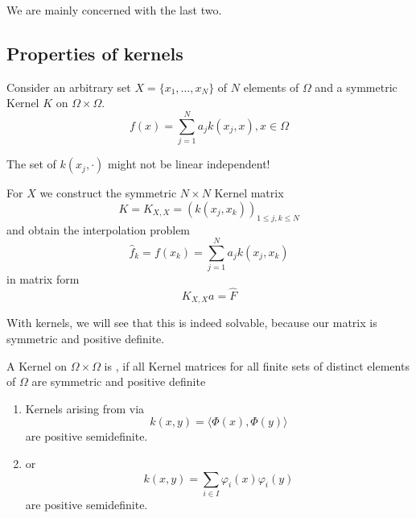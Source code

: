 We are mainly concerned with the last two.


\subsection{Properties of kernels}
Consider an arbitrary set $X=\{x_1,\dots,x_N\}$ 
of $N$  elements of $\Omega$ 
and a symmetric Kernel $K$ on $\Omega\times \Omega$.
\[f(x)=\sum_{j=1}^N a_j k(x_j,x),x\in\Omega\]
\begin{remark}
    The set of $k(x_j,\cdot)$ might not be linear independent!
\end{remark}

For $X$ we construct the symmetric $N\times N$ Kernel matrix
\[K=K_{X,X}=(k(x_j,x_k))_{{1\leq j,k\leq N}}\]
and obtain the interpolation problem 
\[\hat{f}_k=f(x_k)=\sum_{j=1}^N a_j k(x_j,x_k)\]
in matrix form 
\[K_{X,X}a=\hat{F}\]

\begin{remark}
    With kernels, we will see that this is indeed solvable, because our matrix is symmetric and positive definite.
\end{remark}

\begin{definition}\label{def:1.3}
    A Kernel on $\Omega\times \Omega$ is 
    ,
    if all Kernel matrices for all finite sets of distinct elements of 
    $\Omega$ are symmetric and positive definite
\end{definition}

\begin{theorem}\label{thm:1.4}
    \begin{enumerate}
        \item Kernels arising from  via \[k(x,y)=\langle\Phi(x),\Phi(y)\rangle\] are positive semidefinite.
        \item {} or  \[k(x,y)=\sum_{i\in I}\varphi_i(x)\varphi_i(y)\] are positive semidefinite.
    \end{enumerate}
\end{theorem}

